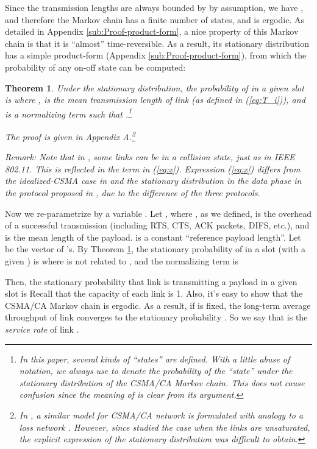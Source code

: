 \documentclass{IEEEtran}
\newtheorem{thm}{Theorem}
\begin{document}
Since the transmission lengths are always bounded by  by
assumption, we have , and therefore the Markov
chain has a finite number of states, and is ergodic. As detailed in
Appendix \ref{sub:Proof-product-form}, a nice property of this Markov
chain is that it is {}``almost'' time-reversible. As a result, its
stationary distribution has a simple product-form (Appendix \ref{sub:Proof-product-form}),
from which the probability of any on-off state  can be computed:
\begin{thm}
\label{thm:state-distribution}Under the stationary distribution,
the probability of  in a given slot is 
where ,  is the mean transmission length
of link  (as defined in (\ref{eq:T_i})), and  is a normalizing
term such that .\footnote{In this paper, several kinds of {}``states'' are defined. With a
little abuse of notation, we always use  to denote the
probability of the {}``state'' under the stationary distribution
of the CSMA/CA Markov chain. This does not cause confusion since the
meaning of  is clear from its argument.}

The proof is given in Appendix A.\footnote{In \cite{asymptotic}, a similar model for CSMA/CA network is formulated
with analogy to a loss network \cite{loss_network}. However, since
\cite{asymptotic} studied the case when the links are unsaturated,
the explicit expression of the stationary distribution was difficult
to obtain.}

Remark: Note that in , some links can be in a collision state,
just as in IEEE 802.11. This is reflected in the 
term in (\ref{eq:x}). Expression (\ref{eq:x}) differs from the idealized-CSMA
case in \cite{Allerton} and the stationary distribution in the data
phase in the protocol proposed in \cite{Jian}, due to the difference
of the three protocols.
\end{thm}
Now we re-parametrize  by a variable . Let ,
where , as we defined, is the overhead of a successful transmission
(including RTS, CTS, ACK packets, DIFS, etc.), and 
is the mean length of the payload.  is a constant {}``reference
payload length''. Let  be the vector of 's. By
Theorem \ref{thm:state-distribution}, the stationary probability
of  in a slot (with a given ) is 
where 
is not related to , and the normalizing term is 


Then, the stationary probability that link  is transmitting a
payload in a given slot is
Recall that the capacity of each link is 1. Also, it's easy to show
that the CSMA/CA Markov chain is ergodic. As a result, if 
is fixed, the long-term average throughput of link  converges
to the stationary probability . So we say that 
is the \emph{service rate} of link .
\end{document}

